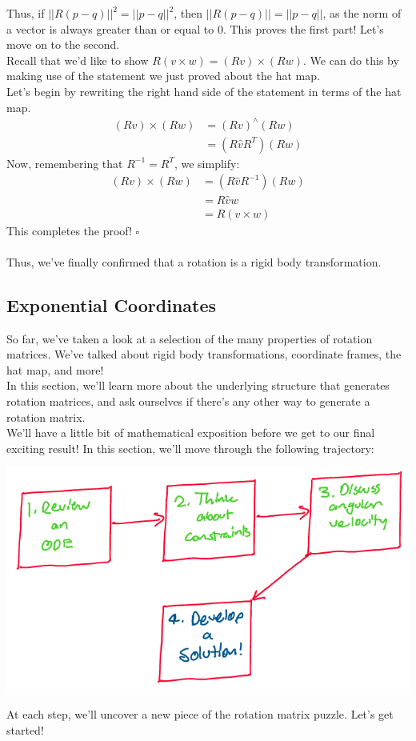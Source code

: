 \documentclass[oneside]{book}
\begin{document}
Thus, if $||R(p-q)||^2 = ||p-q||^2$, then $||R(p-q)|| = ||p-q||$, as the norm of a vector is always greater than or equal to 0. This proves the first part! Let's move on to the second. \\
Recall that we'd like to show $R(v\times w) = (Rv) \times (Rw)$. We can do this by making use of the statement we just proved about the hat map.\\
Let's begin by rewriting the right hand side of the statement in terms of the hat map.
\begin{align}
    (Rv) \times (Rw) &= (Rv)^\wedge(Rw)\\
    &= (R\hat{v}R^T)(Rw)
\end{align}
Now, remembering that $R^{-1} = R^T$, we simplify:
\begin{align}
    (Rv) \times (Rw) &= (R\hat{v}R^{-1})(Rw)\\
    &= R\hat{v}w\\
    &= R(v\times w)
\end{align}
This completes the proof! $\square$\\\\
Thus, we've finally confirmed that a rotation is a rigid body transformation.

\subsection{Exponential Coordinates}
So far, we've taken a look at a selection of the many properties of rotation matrices. We've talked about rigid body transformations, coordinate frames, the hat map, and more!\\
In this section, we'll learn more about the underlying structure that generates rotation matrices, and ask ourselves if there's any other way to generate a rotation matrix.\\
We'll have a little bit of mathematical exposition before we get to our final exciting result! In this section, we'll move through the following trajectory:
\begin{center}
    \includegraphics[scale=0.4]{images/sectraj.png}
\end{center}
At each step, we'll uncover a new piece of the rotation matrix puzzle. Let's get started!
\end{document}

